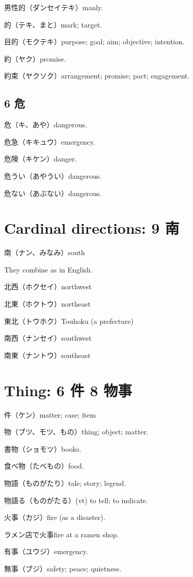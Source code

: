 男性的（ダンセイテキ）manly.

的（テキ、まと）mark; target.

目的（モクテキ）purpose; goal; aim; objective; intention.

約（ヤク）promise.

約束（ヤクソク）arrangement; promise; pact; engagement.

\subsection{6 危}

危（キ、あや）dangerous.

危急（キキュウ）emergency.

危険（キケン）danger.

危うい（あやうい）dangerous.

危ない（あぶない）dangerous.

\section{Cardinal directions: 9 南}

南（ナン、みなみ）south

They combine as in English.

北西（ホクセイ）northwest

北東（ホクトウ）northeast

東北（トウホク）Touhoku (a prefecture)

南西（ナンセイ）southwest

南東（ナントウ）southeast

\section{Thing: 6 件 8 物事}

件（ケン）matter; case; item

物（ブツ、モツ、もの）thing; object; matter.

書物（ショモツ）books.

食べ物（たべもの）food.

物語（ものがたり）tale; story; legend.

物語る（ものがたる）(vt) to tell; to indicate.

火事（カジ）fire (as a disaster).

ラメン店で火事fire at a ramen shop.

有事（ユウジ）emergency.

無事（ブジ）safety; peace; quietness.

